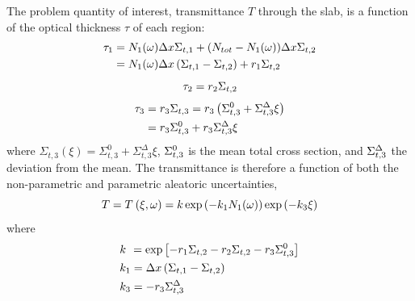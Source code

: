 The problem quantity of interest, transmittance $T$ through the slab, is a function of the optical thickness $\tau$ of each region:
\begin{equation}\label{eq:tau1}
\begin{split}
 \tau_1 &= N_1(\omega) \Delta x \Sigma_{t,1} + (N_{tot} - N_1(\omega)) \Delta x \Sigma_{t,2} \\
    &= N_1(\omega) \Delta x \left( \Sigma_{t,1} - \Sigma_{t,2} \right) + r_1 \Sigma_{t,2}
\end{split}
\end{equation}
\begin{equation}\label{eq:tau2}
    \tau_2 = r_2 \Sigma_{t,2}
\end{equation}
\begin{equation}\label{eq:tau3}
\begin{split}
 \tau_3 &= r_3\Sigma_{t,3} = r_3 \left( \Sigma_{t,3}^{0} + \Sigma_{t,3}^{\Delta} \xi \right) \\
        &= r_3 \Sigma_{t,3}^{0} + r_3 \Sigma_{t,3}^{\Delta} \xi
\end{split}
\end{equation}
where $\Sigma_{t,3}(\xi)=\Sigma_{t,3}^0+\Sigma_{t,3}^\Delta \xi$, $\Sigma_{t,3}^{0}$ is the mean total cross section, and $\Sigma_{t,3}^{\Delta}$ the deviation from the mean. The transmittance is therefore a function of both the non-parametric and parametric aleatoric uncertainties, 
\begin{equation}\label{eq:transmission}
 T = T^{}\left( \xi, \omega \right) = k \exp \left( -k_1 N_1(\omega) \right) \exp \left( -k_3 \xi \right)
\end{equation}
where
\begin{subequations}\label{eq:constants}
\begin{align}
 &k \hspace{0.13cm}= \exp \left[ -r_1 \Sigma_{t,2} - r_2 \Sigma_{t,2} -r_3 \Sigma_{t,3}^{0} \right] \\
 &k_1 = \Delta x \left(\Sigma_{t,1} - \Sigma_{t,2} \right) \\
 &k_3 = -r_3 \Sigma_{t,3}^{\Delta}
\end{align}
\end{subequations}

